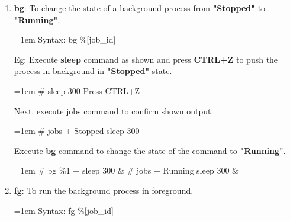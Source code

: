 \begin{flushleft}
\begin{enumerate}
\begin{itemize}
\begin{enumerate}
			\bigskip
			
			\item \textbf{bg}: To change the state of a background process from \textbf{"Stopped"} to \textbf{"Running"}.
			\begin{tcolorbox}[breakable,notitle,boxrule=-0pt,colback=pink,colframe=pink]
				\color{black}
				\font=1em
				Syntax: bg \%[job\_id]
				\font=4pt
			\end{tcolorbox}
			
			Eg: Execute \textbf{sleep} command as shown and press \textbf{CTRL+Z} to push the process in background in \textbf{"Stopped"} state.
			\begin{tcolorbox}[breakable,notitle,boxrule=-0pt,colback=black,colframe=black]
				\color{green}
				\font=1em
				\# sleep 300 
				\color{yellow}
				\newline
				Press CTRL+Z
				\font=4pt
			\end{tcolorbox}
			Next, execute jobs command to confirm shown output:
			\begin{tcolorbox}[breakable,notitle,boxrule=-0pt,colback=black,colframe=black]
				\color{green}
				\font=1em
				\# jobs 
				\color{white}
				\newline
				[1]+  Stopped                 sleep 300
				\font=4pt
			\end{tcolorbox}
			Execute \textbf{bg} command to change the state of the command to \textbf{"Running"}.
			\begin{tcolorbox}[breakable,notitle,boxrule=-0pt,colback=black,colframe=black]
				\color{green}
				\font=1em
				\# bg \%1
				\color{white}
				\newline
				[1]+ sleep 300 \&
				\newline
				\color{green}
				\# jobs
				\color{white}
				\newline
				[1]+  Running                 sleep 300 \&
				\font=4pt
			\end{tcolorbox}
			
			\bigskip
			\bigskip
			
				\item \textbf{fg}: To run the background process in foreground.
			\begin{tcolorbox}[breakable,notitle,boxrule=-0pt,colback=pink,colframe=pink]
				\color{black}
				\font=1em
				Syntax: fg \%[job\_id]
				\font=4pt
			\end{tcolorbox}
			

\end{enumerate}
\end{itemize}
\end{enumerate}
\end{flushleft}
